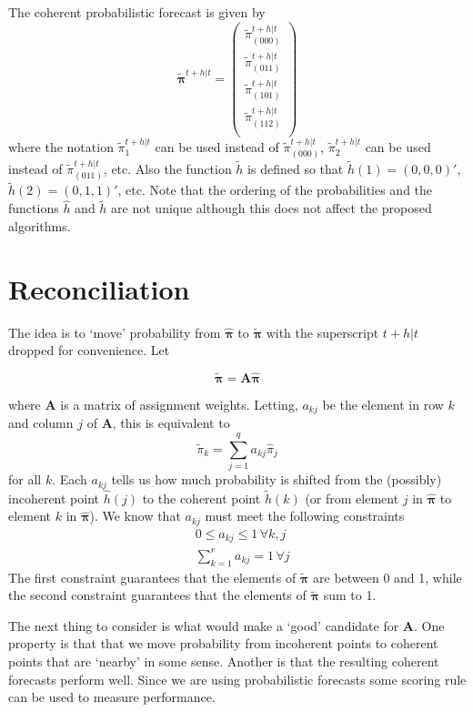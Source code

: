 \documentclass{article}
\newcommand{\bpi}{\bm{\pi}}
\begin{document}
    The coherent probabilistic forecast is given by
    \[
    \tilde{\bpi}^{t+h|t}=\begin{pmatrix}
    \tilde{\pi}^{t+h|t}_{(000)}\\
    \tilde{\pi}^{t+h|t}_{(011)}\\
    \tilde{\pi}^{t+h|t}_{(101)}\\
    \tilde{\pi}^{t+h|t}_{(112)}\\
    \end{pmatrix}
    \]
    where the notation $\tilde{\pi}^{t+h|t}_{1}$ can be used instead of $\tilde{\pi}^{t+h|t}_{(000)}$, $\tilde{\pi}^{t+h|t}_{2}$ can be used instead of $\tilde{\pi}^{t+h|t}_{(011)}$, etc. Also the function $\tilde{h}$ is defined so that $\tilde{h}(1)=(0,0,0)'$, $\tilde{h}(2)=(0,1,1)'$, etc. Note that the ordering of the probabilities and the functions $\hat{h}$ and $\tilde{h}$ are not unique although this does not affect the proposed algorithms.
    
    \section{Reconciliation}
    
    The idea is to `move' probability from $\hat{\bpi}$ to $\tilde{\bpi}$ with the superscript $t+h|t$ dropped for convenience.  Let
    
    \[
    \tilde{\bpi}=\bm{A}\hat{\bpi}
    \] 
    
    where $\bm{A}$ is a matrix of assignment weights. Letting, $a_{kj}$ be the element in row $k$ and column $j$ of $\bm{A}$, this is equivalent to
    \[
      \tilde{\pi}_k=\sum\limits_{j=1}^q a_{kj}\hat{{\pi}}_j
    \]
    for all $k$. Each $a_{kj}$ tells us how much probability is shifted from the (possibly) incoherent point $\hat{h}(j)$ to the coherent point $\tilde{h}(k)$ (or from element $j$ in $\hat{\bpi}$ to element $k$ in $\hat{\bpi}$). We know that $a_{kj}$ must meet the following constraints
    \begin{align*}
    &0\leq a_{kj} \leq 1 \,\forall k, j\\ 
    &\sum\limits_{k=1}^r a_{kj} = 1 \,\forall j 
    \end{align*}
    The first constraint guarantees that the elements of $\tilde{\bpi}$ are between 0 and 1, while the second constraint guarantees that the elements of $\tilde{\bpi}$ sum to 1.
    
    The next thing to consider is what would make a `good' candidate for $\bm{A}$.  One property is that that we move probability from incoherent points to coherent points that are  `nearby' in some sense. Another is that the resulting coherent forecasts perform well.  Since we are using probabilistic forecasts some scoring rule can be used to measure performance.
    
\end{document}
